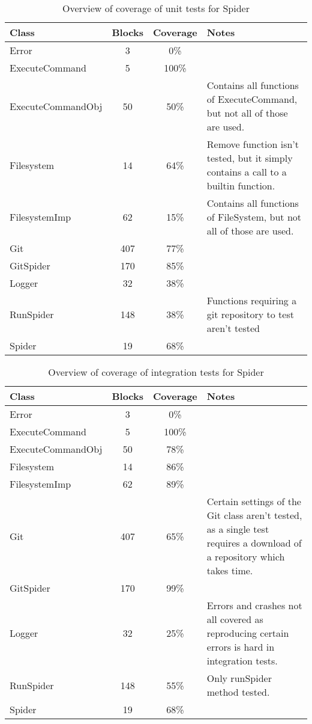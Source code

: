 \documentclass[./Main.tex]{subfiles}
\begin{document}
\begin{table}[h]
    \centering
    \begin{tabular}{l|c|c|p{7cm}}
        Class & Blocks & Coverage & Notes \\
        \hline
        Error & 3 & 0\% &  \\
        ExecuteCommand & 5 & 100\% &  \\
        ExecuteCommandObj & 50 & 50\% & Contains all functions of ExecuteCommand, but not all of those are used. \\ 
        Filesystem & 14 & 64\% & Remove function isn't tested, but it simply contains a call to a builtin function. \\ 
        FilesystemImp & 62 & 15\% & Contains all functions of FileSystem, but not all of those are used. \\ 
        Git & 407 & 77\% &  \\
        GitSpider & 170 & 85\% &  \\
        Logger & 32 & 38\% &  \\
        RunSpider & 148 & 38\% & Functions requiring a git repository to test aren't tested \\
        Spider & 19 & 68\% &  \\
  \end{tabular}
    \caption{Overview of coverage of unit tests for Spider}
    \label{tab:spider_unit_test_coverage}
\end{table}

\begin{table}[h]
    \centering
    \begin{tabular}{l|c|c|p{7cm}}
        Class & Blocks & Coverage & Notes \\
        \hline
        Error & 3 & 0\% &  \\
        ExecuteCommand & 5 & 100\% &  \\
        ExecuteCommandObj & 50 & 78\% &  \\
        Filesystem & 14 & 86\% &  \\
        FilesystemImp & 62 & 89\% &  \\
        Git & 407 & 65\% & Certain settings of the Git class aren't tested, as a single test requires a download of a repository which takes time. \\
        GitSpider & 170 & 99\% &  \\
        Logger & 32 & 25\% & Errors and crashes not all covered as reproducing certain errors is hard in integration tests. \\
        RunSpider & 148 & 55\% & Only runSpider method tested. \\
        Spider & 19 & 68\% &  \\
  \end{tabular}
    \caption{Overview of coverage of integration tests for Spider}
    \label{tab:spider_integration_test_coverage}
\end{table}
\end{document}
